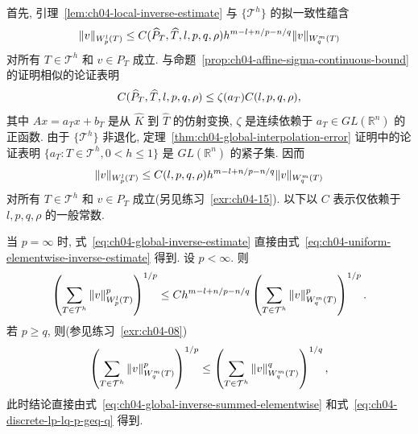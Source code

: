 \begin{Proof}
首先, 引理~\ref{lem:ch04-local-inverse-estimate} 与 $\{\mathcal T^h\}$ 的拟一致性蕴含
\begin{equation}
\MathBookFormulaID{formula-ch04-elementwise-inverse-shape-constant}
\label{eq:ch04-elementwise-inverse-shape-constant}
\|v\|_{W_p^l(T)}
\leq C(\widehat P_T,\widehat T,l,p,q,\rho)
h^{m-l+n/p-n/q}\|v\|_{W_q^m(T)}
\end{equation}
对所有 $T\in\mathcal T^h$ 和 $v\in P_T$ 成立. 与命题~\ref{prop:ch04-affine-sigma-continuous-bound} 的证明相似的论证表明
\begin{equation}
\MathBookFormulaID{formula-ch04-inverse-shape-constant-affine-bound}
\label{eq:ch04-inverse-shape-constant-affine-bound}
C(\widehat P_T,\widehat T,l,p,q,\rho)
\leq\zeta(a_T)C(l,p,q,\rho),
\end{equation}
其中 $Ax=a_Tx+b_T$ 是从 $\widehat K$ 到 $\widehat T$ 的仿射变换, $\zeta$ 是连续依赖于 $a_T\in GL(\mathbb R^n)$ 的正函数. 由于 $\{\mathcal T^h\}$ 非退化, 定理~\ref{thm:ch04-global-interpolation-error} 证明中的论证表明 $\{a_T:T\in\mathcal T^h,0<h\leq1\}$ 是 $GL(\mathbb R^n)$ 的紧子集. 因而
\begin{equation}
\MathBookFormulaID{formula-ch04-uniform-elementwise-inverse-estimate}
\label{eq:ch04-uniform-elementwise-inverse-estimate}
\|v\|_{W_p^l(T)}
\leq C(l,p,q,\rho)h^{m-l+n/p-n/q}\|v\|_{W_q^m(T)}
\end{equation}
对所有 $T\in\mathcal T^h$ 和 $v\in P_T$ 成立(另见练习~\ref{exr:ch04-15}). 以下以 $C$ 表示仅依赖于 $l,p,q,\rho$ 的一般常数.

当 $p=\infty$ 时, 式~\eqref{eq:ch04-global-inverse-estimate} 直接由式~\eqref{eq:ch04-uniform-elementwise-inverse-estimate} 得到. 设 $p<\infty$. 则
\begin{equation}
\MathBookFormulaID{formula-ch04-global-inverse-summed-elementwise}
\label{eq:ch04-global-inverse-summed-elementwise}
\left(\sum_{T\in\mathcal T^h}\|v\|_{W_p^l(T)}^p\right)^{1/p}
\leq Ch^{m-l+n/p-n/q}
\left(\sum_{T\in\mathcal T^h}\|v\|_{W_q^m(T)}^p\right)^{1/p}.
\end{equation}
若 $p\geq q$, 则(参见练习~\ref{exr:ch04-08})
\begin{equation}
\MathBookFormulaID{formula-ch04-discrete-lp-lq-p-geq-q}
\label{eq:ch04-discrete-lp-lq-p-geq-q}
\left(\sum_{T\in\mathcal T^h}\|v\|_{W_q^m(T)}^p\right)^{1/p}
\leq\left(\sum_{T\in\mathcal T^h}\|v\|_{W_q^m(T)}^q\right)^{1/q},
\end{equation}
此时结论直接由式~\eqref{eq:ch04-global-inverse-summed-elementwise} 和式~\eqref{eq:ch04-discrete-lp-lq-p-geq-q} 得到.


\end{Proof}
